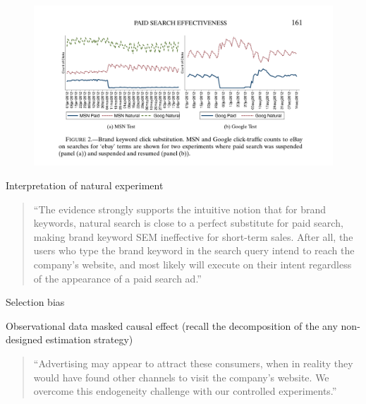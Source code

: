 \documentclass{beamer}
\begin{document}
\begin{frame}

\begin{figure}
\begin{center}
\includegraphics[scale=0.2]{./lecture_includes/tadelis_fig1.png}
\end{center}
\end{figure}

\end{frame}

\begin{frame}{Interpretation of natural experiment}

\begin{quote}
``The evidence strongly supports the intuitive notion that for brand keywords, natural search is close to a perfect substitute for paid search, making brand keyword SEM ineffective for short-term sales.  After all, the users who type the brand keyword in the search query intend to reach the company's website, and most likely will execute on their intent regardless of the appearance of a paid search ad.''
\end{quote}

\end{frame}

\begin{frame}{Selection bias}

Observational data masked causal effect (recall the decomposition of the any non-designed estimation strategy)

\bigskip

\begin{quote}
``Advertising may appear to attract these consumers, when in reality they would have found other channels to visit the company's website.  We overcome this endogeneity challenge with our controlled experiments.''
\end{quote}

\end{frame}
\end{document}

